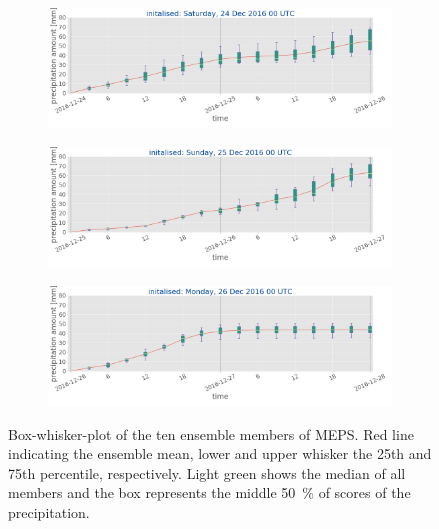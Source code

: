 \begin{figure}[h!]
	\centering
	\begin{subfigure}[b]{\textwidth}
		\centering
		\includegraphics[trim ={0cm 2.2cm 0cm 0cm},clip,width=\textwidth]{./fig_boxplot_sfc/20161224_0}
		\caption{}\label{fig:boxplot:24}
	\end{subfigure}
	\begin{subfigure}[b]{\textwidth}
		\centering
		\includegraphics[trim ={0cm 2.2cm 0cm 0cm},clip,width=\textwidth]{./fig_boxplot_sfc/20161225_0}
		\caption{}\label{fig:boxplot:25}
	\end{subfigure}
	\begin{subfigure}[b]{\textwidth}
		\centering
		\includegraphics[trim ={0cm 1.cm 0cm 0cm},clip,width=\textwidth]{./fig_boxplot_sfc/20161226_0}
		\caption{}\label{fig:boxplot:26}
	\end{subfigure}
	\caption{Box-whisker-plot of the ten ensemble members of MEPS. Red line indicating the ensemble mean, lower and upper whisker the 25th and 75th percentile, respectively. Light green shows the median of all members and the box represents the middle \SI{50}{\percent} of scores of the precipitation.}\label{fig:boxplot}
\end{figure}
